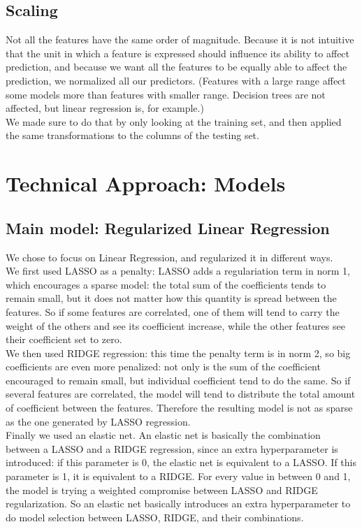 \documentclass[11pt]{article}
\begin{document}
    \subsection{Scaling}
    Not all the features have the same order of magnitude. Because it is not intuitive that the unit in which a feature is expressed
    should influence its ability to affect prediction, and because we want all the features to be equally able to affect the prediction,
    we normalized all our predictors. (Features with a large range affect some models more than features with smaller range. Decision trees
    are not affected, but linear regression is, for example.) \\
    We made sure to do that by only looking at the training set, and then applied the same transformations to the columns of the testing set.
    
    
\section{Technical Approach: Models}
    \subsection{Main model: Regularized Linear Regression}
    We chose to focus on Linear Regression, and regularized it in different ways. \\
    We first used LASSO as a penalty: LASSO adds a regulariation term in norm 1, which encourages a sparse model: the total sum of the
    coefficients tends to remain small, but it does not matter how this quantity is spread between the features.
    So if some features are correlated, one of them will tend to carry the weight of the others and see its coefficient increase, while the 
    other features see their coefficient set to zero. \\
    We then used RIDGE regression: this time the penalty term is in norm 2, so big coefficients are even more penalized: not only is the sum
    of the coefficient encouraged to remain small, but individual coefficient tend to do the same. So if several features are
    correlated, the model will tend to distribute the total amount of coefficient between the features. Therefore the resulting model is not
    as sparse as the one generated by LASSO regression. \\
    Finally we used an elastic net. An elastic net is basically the combination between a LASSO and a RIDGE regression, since an extra
    hyperparameter is introduced: if this parameter is 0, the elastic net is equivalent to a LASSO. If this parameter is 1, it is equivalent
    to a RIDGE. For every value in between 0 and 1, the model is trying a weighted compromise between LASSO and RIDGE regularization.
    So an elastic net basically introduces an extra hyperparameter to do model selection between LASSO, RIDGE, and their combinations.
    
\end{document}
